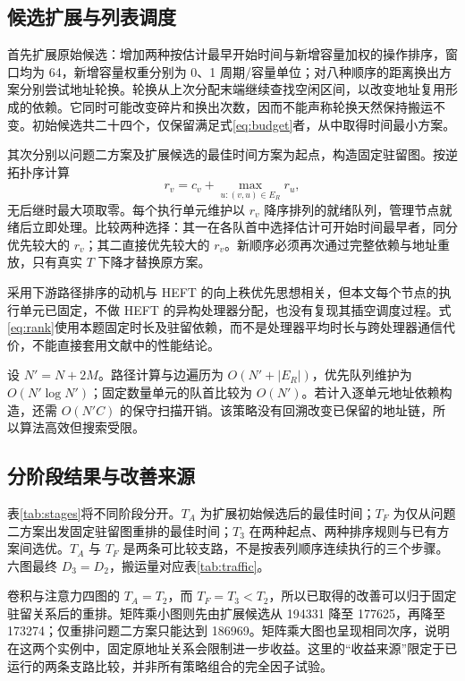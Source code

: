 \subsection{候选扩展与列表调度}
首先扩展原始候选：增加两种按估计最早开始时间与新增容量加权的操作排序，窗口均为 64，新增容量权重分别为 0、1 周期/容量单位；对八种顺序的距离换出方案分别尝试地址轮换。轮换从上次分配末端继续查找空闲区间，以改变地址复用形成的依赖。它同时可能改变碎片和换出次数，因而不能声称轮换天然保持搬运不变。初始候选共二十四个，仅保留满足式\eqref{eq:budget}者，从中取得时间最小方案。

其次分别以问题二方案及扩展候选的最佳时间方案为起点，构造固定驻留图。按逆拓扑序计算
\begin{equation}
r_v=c_v+\max_{u:(v,u)\in E_R}r_u,\label{eq:rank}
\end{equation}
无后继时最大项取零。每个执行单元维护以 $r_v$ 降序排列的就绪队列，管理节点就绪后立即处理。比较两种选择：其一在各队首中选择估计可开始时间最早者，同分优先较大的 $r_v$；其二直接优先较大的 $r_v$。新顺序必须再次通过完整依赖与地址重放，只有真实 $T$ 下降才替换原方案。

采用下游路径排序的动机与 HEFT 的向上秩优先思想相关\cite{heft}，但本文每个节点的执行单元已固定，不做 HEFT 的异构处理器分配，也没有复现其插空调度过程。式\eqref{eq:rank}使用本题固定时长及驻留依赖，而不是处理器平均时长与跨处理器通信代价，不能直接套用文献中的性能结论。

设 $N'=N+2M$。路径计算与边遍历为 $O(N'+|E_R|)$，优先队列维护为 $O(N'\log N')$；固定数量单元的队首比较为 $O(N')$。若计入逐单元地址依赖构造，还需 $O(N'C)$ 的保守扫描开销。该策略没有回溯改变已保留的地址链，所以算法高效但搜索受限。

\subsection{分阶段结果与改善来源}
表\ref{tab:stages}将不同阶段分开。$T_A$ 为扩展初始候选后的最佳时间；$T_F$ 为仅从问题二方案出发固定驻留图重排的最佳时间；$T_3$ 在两种起点、两种排序规则与已有方案间选优。$T_A$ 与 $T_F$ 是两条可比较支路，不是按表列顺序连续执行的三个步骤。六图最终 $D_3=D_2$，搬运量对应表\ref{tab:traffic}。
\begin{table}[H]\centering\caption{预算不增加条件下的时间对照（周期）}\label{tab:stages}\small
\end{table}

卷积与注意力四图的 $T_A=T_2$，而 $T_F=T_3<T_2$，所以已取得的改善可以归于固定驻留关系后的重排。矩阵乘小图则先由扩展候选从 194331 降至 177625，再降至 173274；仅重排问题二方案只能达到 186969。矩阵乘大图也呈现相同次序，说明在这两个实例中，固定原地址关系会限制进一步收益。这里的“收益来源”限定于已运行的两条支路比较，并非所有策略组合的完全因子试验。

